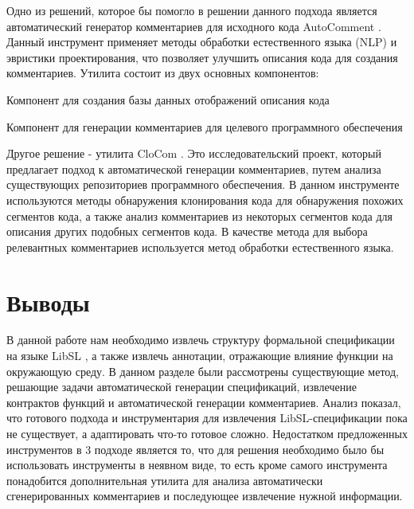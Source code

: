 Одно из решений, которое бы помогло в решении данного подхода является автоматический генератор комментариев для исходного кода AutoComment \cite{AutoComment}.
Данный инструмент применяет методы обработки естественного языка (NLP) и эвристики проектирования, что позволяет улучшить описания кода для создания комментариев.
Утилита состоит из двух основных компонентов:
%
\begin{itemize*}
\item Компонент для создания базы данных отображений описания кода
\item Компонент для генерации комментариев для целевого программного обеспечения
\end{itemize*}
%

Другое решение - утилита CloCom \cite{CloCom}. Это исследовательский проект, который предлагает подход к автоматической генерации комментариев, путем анализа существующих репозиториев программного обеспечения.
В данном инструменте используются методы обнаружения клонирования кода для обнаружения похожих сегментов кода, а также анализ комментариев из некоторых сегментов кода для описания других подобных сегментов кода.
В качестве метода для выбора релевантных комментариев используется метод обработки естественного языка.


\section{Выводы}

В данной работе нам необходимо извлечь структуру формальной спецификации на языке LibSL \cite{libsl, libsl2}, а также извлечь аннотации, отражающие влияние функции на окружающую среду.
В данном разделе были рассмотрены существующие метод, решающие задачи автоматической генерации спецификаций, извлечение контрактов функций и автоматической генерации комментариев.
Анализ показал, что готового подхода и инструментария для извлечения LibSL-спецификации пока не существует, а адаптировать что-то готовое сложно.
Недостатком предложенных инструментов в 3 подходе является то, что для решения необходимо было бы использовать инструменты в неявном виде, то есть кроме самого инструмента понадобится дополнительная утилита для анализа автоматически сгенерированных комментариев и последующее извлечение нужной информации.
